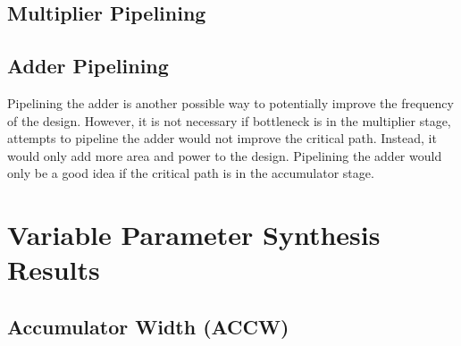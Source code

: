 \documentclass[a4paper,11pt]{article}
\begin{document}
\subsection{Multiplier Pipelining}




\subsection{Adder Pipelining}

Pipelining the adder is another possible way to potentially improve the frequency of the design. However, it is not necessary if bottleneck is in the multiplier stage, attempts to pipeline the adder would not improve the critical path. Instead, it would only add more area and power to the design. Pipelining the adder would only be a good idea if the critical path is in the accumulator stage. 


\section{Variable Parameter Synthesis Results}


\subsection{Accumulator Width (ACCW)}
\end{document}
